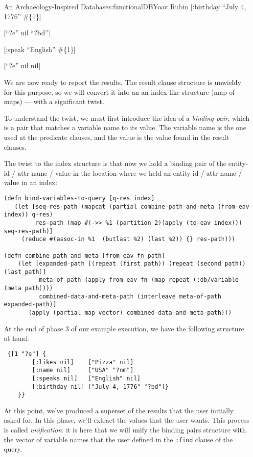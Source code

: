 \begin{aosachapter}{An Archaeology-Inspired Database}{s:functionalDB}{Yoav Rubin}
{[}:birthday ``July 4, 1776'' \#\{1\}{]}

{[}``?e'' nil ``?bd''{]}

{[}:speak ``English'' \#\{1\}{]}

{[}``?e'' nil nil{]}

We are now ready to report the results. The result clause structure is
unwieldy for this purpose, so we will convert it into an an index-like
structure (map of maps) --- with a significant twist.

To understand the twist, we must first introduce the idea of a
\emph{binding pair}, which is a pair that matches a variable name to its
value. The variable name is the one used at the predicate clauses, and
the value is the value found in the result clauses.

The twist to the index structure is that now we hold a binding pair of
the entity-id / attr-name / value in the location where we held an
entity-id / attr-name / value in an index:

\begin{verbatim}
(defn bind-variables-to-query [q-res index]
   (let [seq-res-path (mapcat (partial combine-path-and-meta (from-eav index)) q-res)         
         res-path (map #(->> %1 (partition 2)(apply (to-eav index))) seq-res-path)] 
     (reduce #(assoc-in %1  (butlast %2) (last %2)) {} res-path)))
     
(defn combine-path-and-meta [from-eav-fn path]
    (let [expanded-path [(repeat (first path)) (repeat (second path)) (last path)] 
          meta-of-path (apply from-eav-fn (map repeat (:db/variable (meta path))))
          combined-data-and-meta-path (interleave meta-of-path expanded-path)]
       (apply (partial map vector) combined-data-and-meta-path)))
\end{verbatim}

At the end of phase 3 of our example execution, we have the following
structure at hand:

\begin{verbatim}
 {[1 "?e"] {
        [:likes nil]    ["Pizza" nil]
        [:name nil]     ["USA" "?nm"]
        [:speaks nil]   ["English" nil] 
        [:birthday nil] ["July 4, 1776" "?bd"]} 
    }}
\end{verbatim}

\label{phase-4-unify-and-report}

At this point, we've produced a superset of the results that the user
initially asked for. In this phase, we'll extract the values that the
user wants. This process is called \emph{unification}: it is here that
we will unify the binding pairs structure with the vector of variable
names that the user defined in the \texttt{:find} clause of the query.


\end{aosachapter}
